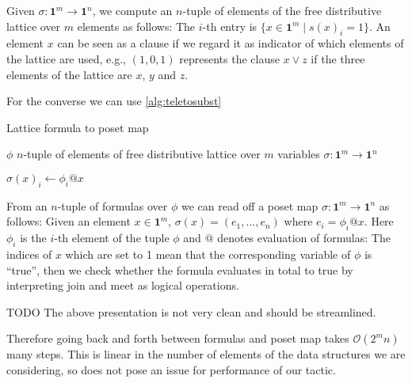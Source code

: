 \documentclass{llncs}
\newcommand{\todo}[1]{
  \begin{tcolorbox}
    TODO {#1} 
  \end{tcolorbox}
}
\newcommand{\meet}{\vee}
\newcommand{\pint}[1]{\mathbf{1}^{#1}}
\begin{document}
Given $\sigma : \pint{m} \to \pint{n}$, we compute an $n$-tuple of elements of the
free distributive lattice over $m$ elements as follows:
The $i$-th entry is $\{ x \in \pint{m} \mid s(x)_i = 1 \}$. An element $x$ can be
seen as a clause if we regard it as indicator of which elements of the lattice
are used, e.g., $(1,0,1)$ represents the clause $x \meet z$ if the three
elements of the lattice are $x$, $y$ and $z$.


For the converse we can use \autoref{alg:teletosubst}

\begin{algorithm}[H]
  \caption{Lattice formula to poset map}\label{alg:teletosubst}
  \begin{algorithmic}
    \Require $\phi$ $n$-tuple of elements of free distributive lattice over $m$ variables
    \Ensure $\sigma : \pint{m} \to \pint{n}$

    \For{$x \gets \pint{m}$} 
        \State $\sigma(x)_i \gets \phi_i @ x$
      \EndFor
    \EndFor
    \State \Return{$\sigma$}
    \EndProcedure
  \end{algorithmic}
\end{algorithm}

From an $n$-tuple of formulas over $\phi$ we can read off a poset map $\sigma :
\pint{m} \to \pint{n}$ as follows: Given an element $x \in \pint{m}$, $\sigma(x) = (e_1
, ... , e_n) $ where $e_i = \phi_i @ x$. Here $\phi_i$ is the $i$-th element of
the tuple $\phi$ and $@$ denotes evaluation of formulas: The indices of $x$
which are set to 1 mean that the corresponding variable of $\phi$ is ``true'',
then we check whether the formula evaluates in total to true by interpreting
join and meet as logical operations.

\todo{The above presentation is not very clean and should be streamlined.}

Therefore going back and forth between formulas and poset map takes
$\mathcal{O}(2^mn)$ many steps. This is linear in the number of elements of the
data structures we are considering, so does not pose an issue for performance of
our tactic.

\end{document}
